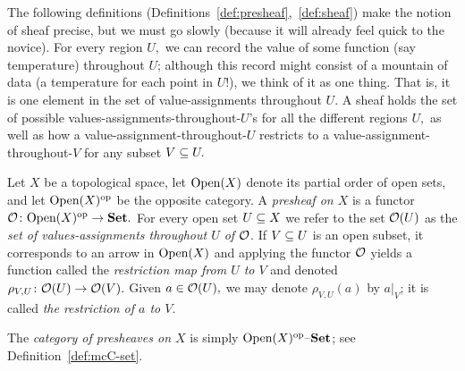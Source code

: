 \documentclass[CT4S-EN-RU]{subfiles}
\begin{document}
\begin{blockENG}
The following definitions (Definitions~\ref{def:presheaf},~\ref{def:sheaf}) make the notion of sheaf precise, but we must go slowly (because it will already feel quick to the novice). For every region $U,$ we can record the value of some function (say temperature) throughout $U$; although this record might consist of a mountain of data (a temperature for each point in $U$!), we think of it as one thing. That is, it is one element in the set of value-assignments throughout $U.$ A sheaf holds the set of possible values-assignments-throughout-$U$'s for all the different regions $U,$ as well as how a value-assignment-throughout-$U$ restricts to a value-assignment-throughout-$V$ for any subset $V\ss U.$
\end{blockENG}

\begin{blockRUS}
\end{blockRUS}

\begin{definitionENG}\label{def:presheaf}
Let $X$ be a topological space, let $\Op(X)$ denote its partial order of open sets, and let $\Op(X)\op$ be the opposite category. A {\em presheaf on $X$} is a functor $\mcO\taking\Op(X)\op\to\Set.$ For every open set $U\ss X$ we refer to the set $\mcO(U)$ as the {\em set of values-assignments throughout $U$ of $\mcO$}. If $V\ss U$ is an open subset, it corresponds to an arrow in $\Op(X)$ and applying the functor $\mcO$ yields a function called the {\em restriction map from $U$ to $V$} and denoted $\rho_{V,U}\taking\mcO(U)\to\mcO(V).$ Given $a\in\mcO(U),$ we may denote $\rho_{V,U}(a)$ by $a|_V$; it is called {\em the restriction of $a$ to $V$}.

The {\em category of presheaves on $X$} is simply $\Op(X)\op\set$; see Definition~\ref{def:mcC-set}.
\end{definitionENG}

\begin{definitionRUS}\label{def:presheaf}
\end{definitionRUS}
\end{document}
